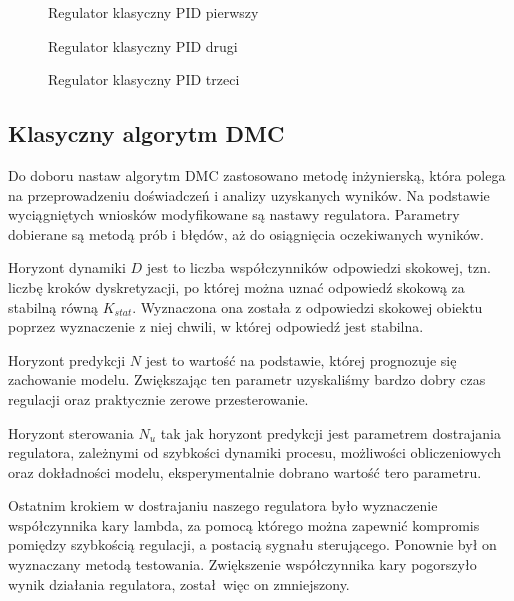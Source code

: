 \begin{figure}[H] 
    \centering
    
    \caption{Regulator klasyczny PID pierwszy}
    \label{projekt:zad4::PID1:figure}
\end{figure}

\begin{figure}[H] 
    \centering
    
    \caption{Regulator klasyczny PID drugi}
    \label{projekt:zad4::PID2:figure}
\end{figure}

\begin{figure}[H] 
    \centering
    
    \caption{Regulator klasyczny PID trzeci}
    \label{projekt:zad4::PID3:figure}
\end{figure}


\subsection{Klasyczny algorytm DMC}
\label{projekt:zad4:DMC}

Do doboru nastaw algorytm DMC zastosowano metodę inżynierską, 
która polega na przeprowadzeniu doświadczeń i analizy uzyskanych wyników. 
Na podstawie wyciągniętych wniosków modyfikowane są nastawy regulatora. 
Parametry  dobierane są metodą prób i błędów, aż do osiągnięcia oczekiwanych wyników.

\indent Horyzont dynamiki $D$ jest to liczba współczynników odpowiedzi skokowej, 
tzn. liczbę kroków dyskretyzacji, po której można uznać odpowiedź skokową za stabilną równą $K_{stat}$. 
Wyznaczona ona została z odpowiedzi skokowej obiektu poprzez wyznaczenie z niej chwili, 
w której odpowiedź jest stabilna.

\indent Horyzont predykcji $N$ jest to wartość na podstawie, 
której prognozuje się zachowanie modelu. 
Zwiększając ten parametr uzyskaliśmy bardzo dobry czas regulacji oraz praktycznie zerowe przesterowanie.

\indent Horyzont sterowania $N_{u}$ tak jak horyzont predykcji jest parametrem dostrajania regulatora, 
zależnymi od szybkości dynamiki procesu, możliwości obliczeniowych oraz dokładności modelu, 
eksperymentalnie dobrano wartość tero parametru.

Ostatnim krokiem w dostrajaniu naszego regulatora było wyznaczenie współczynnika kary lambda, 
za pomocą którego można zapewnić kompromis pomiędzy szybkością regulacji, a postacią sygnału sterującego. 
Ponownie był on wyznaczany metodą testowania. 
Zwiększenie współczynnika kary pogorszyło wynik działania regulatora, został więc on zmniejszony.



